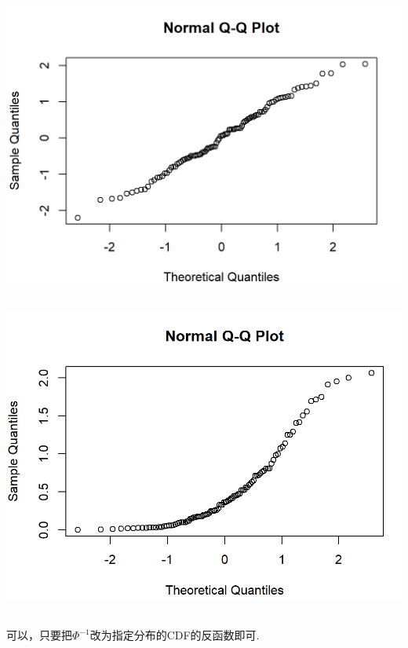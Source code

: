\documentclass{article}
\begin{document}
\begin{CJK}{UTF8}{gbsn}
\subsection{}
\begin{minipage}{0.5\textwidth}
    \includegraphics[scale=0.6]{qqplot_norm.png}
\end{minipage}
\subsection{}
\begin{minipage}{0.5\textwidth}
    \includegraphics[scale=0.6]{qqplot_exp.png}
\end{minipage}
\subsection{}
可以，只要把$\Phi^{-1}$改为指定分布的CDF的反函数即可.

\end{CJK}
\end{document}
